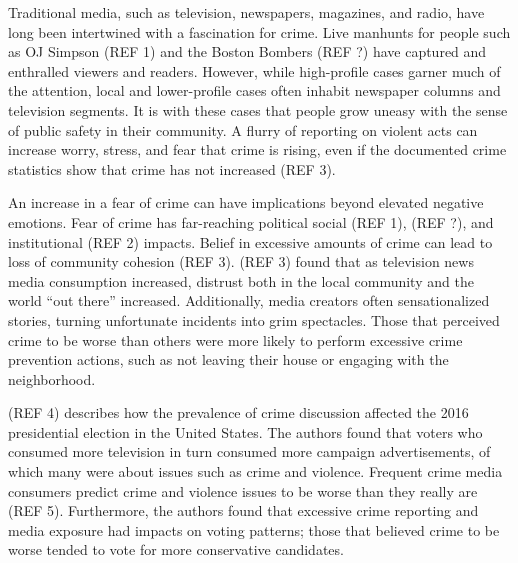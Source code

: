 \documentclass[12pt,oneside, letterpaper]{book}
\begin{document}
\par Traditional media, such as television, newspapers, magazines, and radio, have long been intertwined with a fascination for crime. Live manhunts for people such as OJ Simpson (REF 1) and the Boston Bombers (REF ?) have captured and enthralled viewers and readers. However, while high-profile cases garner much of the attention, local and lower-profile cases often inhabit newspaper columns and television segments. It is with these cases that people grow uneasy with the sense of public safety in their community. A flurry of reporting on violent acts can increase worry, stress, and fear that crime is rising, even if the documented crime statistics show that crime has not increased (REF 3).

\par An increase in a fear of crime can have implications beyond elevated negative emotions. Fear of crime has far-reaching political social (REF 1), (REF ?), and institutional (REF 2) impacts. Belief in excessive amounts of crime can lead to loss of community cohesion (REF 3). (REF 3) found that as television news media consumption increased, distrust both in the local community and the world ``out there'' increased. Additionally, media creators often sensationalized stories, turning unfortunate incidents into grim spectacles. Those that perceived crime to be worse than others were more likely to perform excessive crime prevention actions, such as not leaving their house or engaging with the neighborhood.

\par (REF 4) describes how the prevalence of crime discussion affected the 2016 presidential election in the United States. The authors found that voters who consumed more television in turn consumed more campaign advertisements, of which many were about issues such as crime and violence. Frequent crime media consumers predict crime and violence issues to be worse than they really are (REF 5). Furthermore, the authors found that excessive crime reporting and media exposure had impacts on voting patterns; those that believed crime to be worse tended to vote for more conservative candidates.
\end{document}
